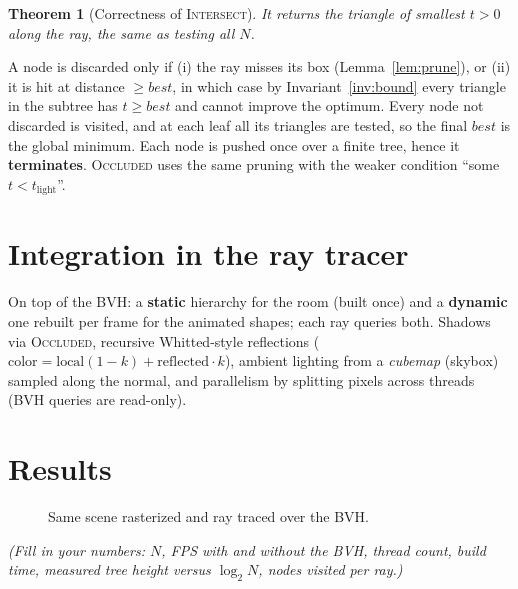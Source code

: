 \documentclass[11pt]{article}
\newtheorem{theorem}{Theorem}
\begin{document}
\begin{theorem}[Correctness of \textsc{Intersect}]
It returns the triangle of smallest $t>0$ along the ray, the same as testing all
$N$.
\end{theorem}
\noindent
A node is discarded only if (i) the ray misses its box (Lemma~\ref{lem:prune}), or
(ii) it is hit at distance $\ge best$, in which case by Invariant~\ref{inv:bound}
every triangle in the subtree has $t \ge best$ and cannot improve the optimum.
Every node not discarded is visited, and at each leaf all its triangles are tested,
so the final $best$ is the global minimum. Each node is pushed once over a finite
tree, hence it \textbf{terminates}. \textsc{Occluded} uses the same pruning with
the weaker condition ``some $t < t_{\text{light}}$''.

\section{Integration in the ray tracer}

On top of the BVH: a \textbf{static} hierarchy for the room (built once) and a
\textbf{dynamic} one rebuilt per frame for the animated shapes; each ray queries
both. Shadows via \textsc{Occluded}, recursive Whitted-style reflections
($\text{color} = \text{local}(1-k) + \text{reflected}\cdot k$), ambient lighting
from a \emph{cubemap} (skybox) sampled along the normal, and parallelism by
splitting pixels across threads (BVH queries are read-only).

\section{Results}

\begin{figure}[h]
  \centering
  \hfill
  \caption{Same scene rasterized and ray traced over the BVH.}
\end{figure}

\noindent
\emph{(Fill in your numbers: $N$, FPS with and without the BVH, thread count, build
time, measured tree height versus $\log_2 N$, nodes visited per ray.)}
\end{document}
